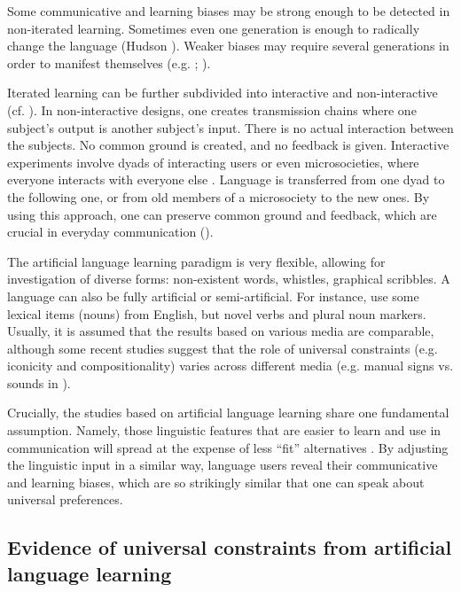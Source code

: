 \documentclass[output=paper]{langsci/langscibook}
\begin{document}
Some communicative and learning biases may be strong enough to be detected in non-iterated learning. Sometimes even one generation is enough to radically change the language (Hudson \citealt{KamNewport2009}). Weaker biases may require several generations in order to manifest themselves (e.g. \citealt{RealiGriffiths2009}; \citealt{SmithWonnacott2010}). 

Iterated learning can be further subdivided into interactive and non-interactive (cf. \citealt{Tamariz2016}). In non-interactive designs, one creates transmission chains where one subject’s output is another subject’s input. There is no actual interaction between the subjects. No common ground is created, and no feedback is given. Interactive experiments involve dyads of interacting users or even microsocieties, where everyone interacts with everyone else \citep{Tamariz2017}. Language is transferred from one dyad to the following one, or from old members of a microsociety to the new ones. By using this approach, one can preserve common ground and feedback, which are crucial in everyday communication (\citealt{CaldwellSmith2012}). 

The artificial language learning paradigm is very flexible, allowing for investigation of diverse forms: non-existent words, whistles, graphical scribbles. A language can also be fully artificial or semi-artificial. For instance, \citet{SmithWonnacott2010} use some lexical items (nouns) from English, but novel verbs and plural noun markers. Usually, it is assumed that the results based on various media are comparable, although some recent studies suggest that the role of universal constraints (e.g. iconicity and compositionality) varies across different media (e.g. manual signs vs. sounds in \citealt{LittleEtAl2017}).

Crucially, the studies based on artificial language learning share one fundamental assumption. Namely, those linguistic features that are easier to learn and use in communication will spread at the expense of less “fit” alternatives \citep{SmithEtAl2017}. By adjusting the linguistic input in a similar way, language users reveal their communicative and learning biases, which are so strikingly similar that one can speak about universal preferences. 

\subsection{Evidence of universal constraints from artificial language learning}
\end{document}
